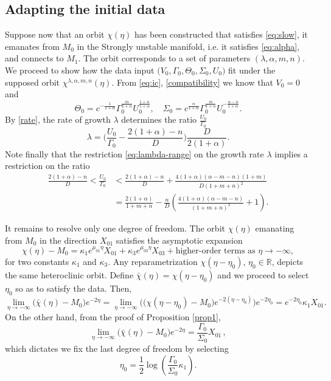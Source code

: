 \documentclass[11pt]{article}
\theoremstyle{remark}
\begin{document}
\subsection{Adapting the initial data } \label{sec:twoparam}
Suppose now that an orbit $\chi(\eta)$ has been constructed that satisfies \eqref{eq:slow}, it emanates from $M_0$ in the Strongly unstable manifold, i.e. it satisfies \eqref{eq:alpha},
and connects to $M_1$. The orbit corresponds to a set of parameters $(\lambda, \alpha, m,n)$. We proceed to show how the data input $\big(V_0,\Gamma_0,\Theta_0,\Sigma_0,U_0 \big)$ fit under the supposed orbit $\chi^{\lambda, \alpha, m,n}(\eta)$. From \eqref{eq:ic}, \eqref{compatibility} we know that $V_0=0$ and
$$\Theta_0 = c^{-\frac{1}{1+\alpha}}\Gamma_0^{\frac{m}{1+\alpha}} U_0^{\frac{1+n}{1+\alpha}}, \quad \Sigma_0 = c^{\frac{\alpha}{1+\alpha}}\Gamma_0^{\frac{m}{1+\alpha}} U_0^{-\frac{\alpha-n}{1+\alpha}}.$$
By \eqref{rate}, the rate of growth $\lambda$ determines the ratio $\frac{U_0}{\Gamma_0}$
\begin{equation} \label{eq:lambda}
 \lambda = \Big(\frac{U_0}{\Gamma_0} - \frac{2(1+\alpha)-n}{D}\Big)\frac{D}{2(1+\alpha)}.
\end{equation}
Note finally that the restriction \eqref{eq:lambda-range} on the growth rate $\lambda$ implies a restriction on the ratio
\begin{equation} \label{eq:restriction}
\begin{aligned}
 \frac{2(1+\alpha) -n}{D} < \frac{U_0}{\Gamma_0} &< \frac{2(1+\alpha) -n}{D} + \frac{4(1+\alpha)(\alpha-m-n)(1+m)}{D(1+m+n)^2}\\
 &=\frac{2(1+\alpha)}{1+m+n} -\frac{n}{D}\left( \frac{4(1+\alpha)(\alpha-m-n)}{(1+m+n)^2} +1\right).
\end{aligned}
\end{equation}

It remains to resolve only one degree of freedom. The orbit $\chi (\eta)$ emanating from $M_0$ in the direction $X_{01}$ satisfies the asymptotic expansion
 \begin{equation}\label{eq:alpha-expan}
  \chi (\eta) - M_0 = \kappa_1 e^{\mu_{01}\eta} X_{01} + \kappa_3 e^{\mu_{03}\eta} X_{03} + \text{higher-order terms as $\eta \rightarrow -\infty$},
 \end{equation}
for two constants $\kappa_1$ and $\kappa_3$.
Any reparametrization $\chi(\eta-\eta_0)$, $\eta_0\in \mathbb{R}$, depicts the same heteroclinic orbit. Define
$\bar \chi (\eta) = \chi (\eta - \eta_0)$ and we proceed to select $\eta_0$ so as to satisfy the data. Then,
$$
\lim_{\eta \rightarrow -\infty}\big( \bar\chi(\eta) - M_0\big)e^{-2 \eta}
= \lim_{\eta \rightarrow -\infty}  \Big ( \big(\chi(\eta-\eta_0) - M_0\big)e^{-2(\eta-\eta_0)} \Big ) e^{-2\eta_0} = e^{ -2\eta_0} \kappa_1 X_{01}.
$$
On the other hand, from the proof of Proposition \ref{prop1},
$$
\lim_{\eta \rightarrow -\infty}\big( \bar\chi(\eta) - M_0\big)e^{ -2\eta}  = \frac{\Gamma_0}{\Sigma_0} X_{01} \, ,
$$
which dictates we fix the last degree of freedom by selecting
\begin{equation}
 \eta_0 = \frac{1}{2}\log \left( \frac{\Gamma_0}{\Sigma_0} \kappa_1\right).%
\end{equation}
\end{document}
